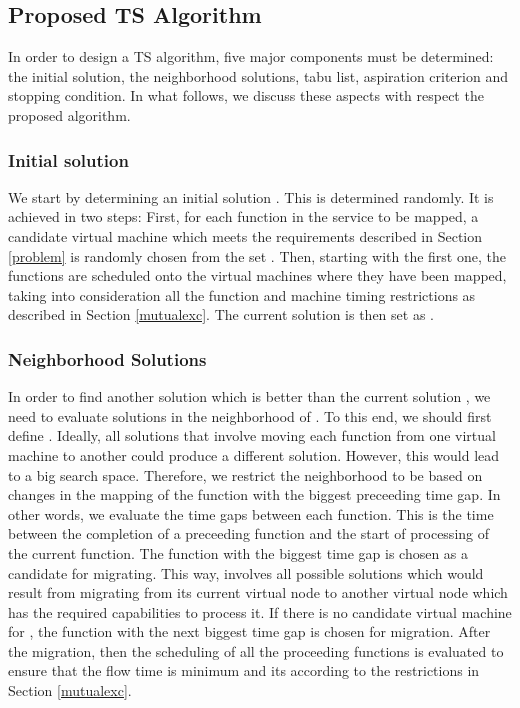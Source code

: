 \documentclass[conference]{IEEEtran}
\begin{document}
\subsection{Proposed TS Algorithm}
In order to design a TS algorithm, five major components must be determined: the initial solution, the neighborhood solutions, tabu list, aspiration criterion and stopping condition. In what follows, we discuss these aspects with respect the proposed algorithm.
\subsubsection{Initial solution} We start by determining an initial solution . This is determined randomly. It is achieved in two steps: First, for each function  in the service to be mapped, a candidate virtual machine  which meets the requirements described in Section \ref{problem} is randomly chosen from the set . Then, starting with the first one, the functions are scheduled onto the virtual machines where they have been mapped, taking into consideration all the function and machine timing restrictions as described in Section \ref{mutualexc}. The current solution  is then set as .
\subsubsection{Neighborhood Solutions} In order to find another solution  which is better than the current solution , we need to evaluate solutions  in the neighborhood of . To this end, we should first define . Ideally, all solutions that involve moving each function from one virtual machine to another could produce a different solution. However, this would lead to a big search space. Therefore, we restrict the neighborhood to be based on changes in the mapping of the function with the biggest preceeding time gap. In other words, we evaluate the time gaps between each function. This is the time between the completion of a preceeding function and the start of processing of the current function. The function  with the biggest time gap is chosen as a candidate for migrating. This way,  involves all possible solutions which would result from migrating  from its current virtual node to another virtual node which has the required capabilities to process it. If there is no candidate virtual machine for , the function with the next biggest time gap is chosen for migration. After the migration, then the scheduling of all the proceeding functions is evaluated to ensure that the flow time is minimum and its according to the restrictions in Section \ref{mutualexc}.
\end{document}
